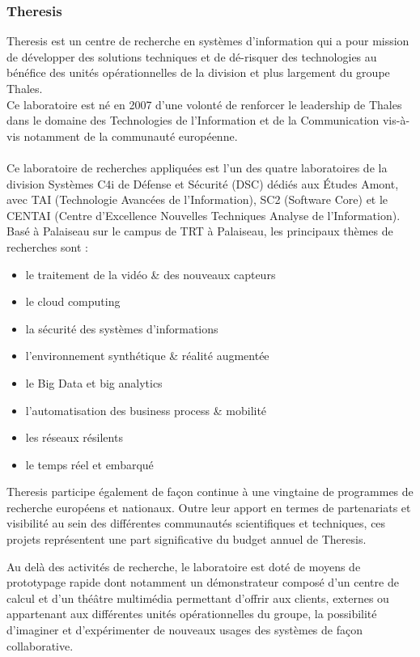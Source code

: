 \documentclass[12pt]{article}
\begin{document}
\subsubsection{Theresis}
Theresis est un centre de recherche en systèmes d'information qui a pour mission de développer des solutions techniques et de dé-risquer des technologies au bénéfice des unités opérationnelles de la division et plus largement du groupe Thales.\\
Ce laboratoire est né en 2007 d'une volonté de renforcer le leadership de Thales dans le domaine des Technologies de l'Information et de la Communication vis-à-vis notamment de la communauté européenne.\\
\\
Ce laboratoire de recherches appliquées est l’un des quatre laboratoires de la division Systèmes C4i de Défense et Sécurité (DSC) dédiés aux Études Amont, avec TAI (Technologie Avancées de l’Information), SC2 (Software Core) et le CENTAI (Centre d’Excellence Nouvelles Techniques Analyse de l’Information).\\
Basé à Palaiseau sur le campus de TRT à Palaiseau, les principaux thèmes de recherches sont :
\begin{itemize}
\item le traitement de la vidéo \& des nouveaux capteurs
\item le cloud computing
\item la sécurité des systèmes d'informations
\item l'environnement synthétique \& réalité augmentée
\item le Big Data et big analytics
\item l'automatisation des business process \& mobilité
\item les réseaux résilents
\item le temps réel et embarqué
\end{itemize}

Theresis participe également de façon continue à une vingtaine de programmes de recherche européens et nationaux. Outre leur apport en termes de partenariats et visibilité au sein des différentes communautés scientifiques et techniques, ces projets représentent une part significative du budget annuel de Theresis.

Au delà des activités de recherche, le laboratoire est doté de moyens de prototypage rapide dont notamment un démonstrateur composé d'un centre de calcul et d'un théâtre multimédia permettant d'offrir aux clients, externes ou appartenant aux différentes unités opérationnelles du groupe, la possibilité d'imaginer et d'expérimenter de nouveaux usages des systèmes de façon collaborative. \\
\end{document}
